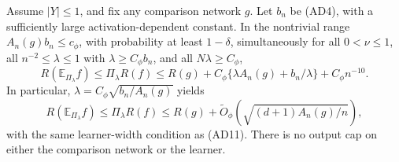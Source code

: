 \begin{theorem}
\label{thm:uncapped-all-d}
Assume $|Y|\le1$, and fix any comparison network $g$.
Let $b_n$ be (AD4), with a sufficiently large
activation-dependent constant. In the nontrivial range
$A_n(g)b_n\le c_\phi$, with probability at least $1-\delta$,
simultaneously for all $0<\nu\le1$, all
$n^{-2}\le\lambda\le1$ with $\lambda\ge C_\phi b_n$, and all
$N\lambda\ge C_\phi$,
\[
 R(\mathbb E_{\Pi_\lambda}f)\le\Pi_\lambda R(f)
 \le R(g)+C_\phi\{\lambda A_n(g)+b_n/\lambda\}
       +C_\phi n^{-10}.                                \tag{WM2}
\]
In particular, $\lambda=C_\phi\sqrt{b_n/A_n(g)}$ yields
\[
 R(\mathbb E_{\Pi_\lambda}f)\le\Pi_\lambda R(f)
 \le R(g)+\widetilde O_\phi\left(\sqrt{(d+1)A_n(g)/n}\right),         \tag{WM3}
\]
with the same learner-width condition as (AD11). There is no output
cap on either the comparison network or the learner.
\end{theorem}
